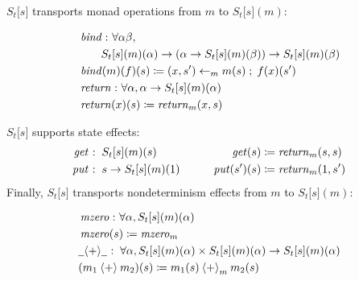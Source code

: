 $S _t  \lbrack s \rbrack $ transports monad operations from $m$ to
$S _t  \lbrack s \rbrack (m)$:

\small\begin{align*}
&\hspace{0em}  \operatorname{\mathit{bind}}   \mathbin{\colon}   \forall   \alpha   \beta ,  \\
&\hspace{2em} S _t  \lbrack s \rbrack (m)( \alpha )  \rightarrow  ( \alpha   \rightarrow  S _t  \lbrack s \rbrack (m)( \beta ))  \rightarrow  S _t  \lbrack s \rbrack (m)( \beta ) \\
&\hspace{0em}  \operatorname{\mathit{bind}}( m)(f)(s)  \coloneqq  (x,s')  \leftarrow  _m  m(s)  \;;\;  f(x)(s') \\
&\hspace{0em}  \operatorname{\mathit{return}}   \mathbin{\colon}   \forall   \alpha ,  \alpha   \rightarrow  S _t  \lbrack s \rbrack (m)( \alpha ) \\
&\hspace{0em}  \operatorname{\mathit{return}}( x)(s)  \coloneqq   \operatorname{\mathit{return}} _m  (x,s)
\end{align*}\normalsize

$S _t  \lbrack s \rbrack $ supports state effects:
\small\begin{alignat*}{4}

 \itop{get}  &  \mathbin{\colon}  S _t  \lbrack s \rbrack (m)(s)     &  \hspace{1em}   \hspace{1em} \itop{get}( s)     &  \coloneqq   \itop{return} _m  (s,s)  \\
 \itop{put}  &  \mathbin{\colon}  s  \rightarrow  S _t  \lbrack s \rbrack (m)(1) &  \hspace{1em}   \hspace{1em} \itop{put}( s')(s) &  \coloneqq   \itop{return} _m  (1,s')

\end{alignat*}\normalsize Finally, $S _t  \lbrack s \rbrack $ transports
nondeterminism effects from $m$ to $S _t  \lbrack s \rbrack (m)$:

\small\begin{align*}
&\hspace{0em}  \operatorname{\mathit{mzero}}   \mathbin{\colon}   \forall   \alpha , S _t  \lbrack s \rbrack (m)( \alpha ) \\
&\hspace{0em}  \operatorname{\mathit{mzero}}( s)  \coloneqq   \operatorname{\mathit{mzero}} _m    \\
&\hspace{0em}  \underline{\hspace{0.5em}}{  \mathbin{\langle + \rangle}  }\underline{\hspace{0.5em}}   \mathbin{\colon}   \forall   \alpha , S _t  \lbrack s \rbrack (m)( \alpha )  \times  S _t  \lbrack s \rbrack (m)( \alpha )  \rightarrow  S _t  \lbrack s \rbrack (m)( \alpha ) \\
&\hspace{0em} (m _1   \mathbin{\langle + \rangle}  m _2 )(s)  \coloneqq  m _1 (s)  \mathbin{\langle + \rangle}  _m  m _2 (s) 
\end{align*}\normalsize

